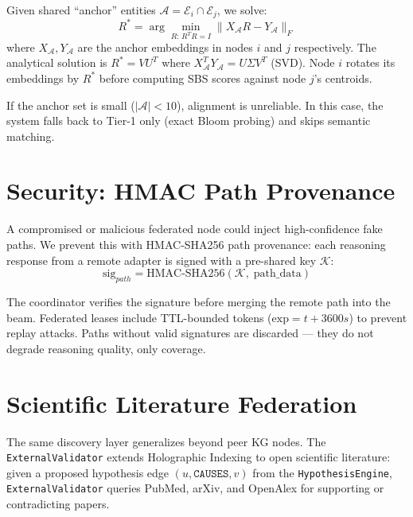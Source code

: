 \documentclass[10pt,twocolumn]{article}
\begin{document}
Given shared ``anchor'' entities $\mathcal{A} = \mathcal{E}_i \cap \mathcal{E}_j$,
we solve:
\begin{equation}
R^* = \arg\min_{R:\,R^TR=I} \|X_\mathcal{A} R - Y_\mathcal{A}\|_F
\label{eq:procrustes}
\end{equation}
where $X_\mathcal{A}, Y_\mathcal{A}$ are the anchor embeddings in nodes $i$ and $j$
respectively. The analytical solution is $R^* = VU^T$ where $X_\mathcal{A}^T Y_\mathcal{A}
= U\Sigma V^T$ (SVD). Node $i$ rotates its embeddings by $R^*$ before computing SBS scores
against node $j$'s centroids.

If the anchor set is small ($|\mathcal{A}| < 10$), alignment is unreliable. In this
case, the system falls back to Tier-1 only (exact Bloom probing) and skips semantic
matching.

\section{Security: HMAC Path Provenance}
\label{sec:security}

A compromised or malicious federated node could inject high-confidence fake paths.
We prevent this with HMAC-SHA256 path provenance: each reasoning response from a
remote adapter is signed with a pre-shared key $\mathcal{K}$:
\begin{equation}
\mathrm{sig}_{path} = \mathrm{HMAC\text{-}SHA256}(\mathcal{K},\; \mathrm{path\_data})
\label{eq:hmac}
\end{equation}

The coordinator verifies the signature before merging the remote path into the beam.
Federated leases include TTL-bounded tokens ($\mathrm{exp} = t + 3600s$) to prevent
replay attacks. Paths without valid signatures are discarded — they do not degrade
reasoning quality, only coverage.

\section{Scientific Literature Federation}
\label{sec:extvalidator}

The same discovery layer generalizes beyond peer KG nodes. The \texttt{ExternalValidator}
extends Holographic Indexing to open scientific literature: given a proposed hypothesis
edge $(u, \texttt{CAUSES}, v)$ from the \texttt{HypothesisEngine}, \texttt{ExternalValidator}
queries PubMed, arXiv, and OpenAlex for supporting or contradicting papers.
\end{document}
